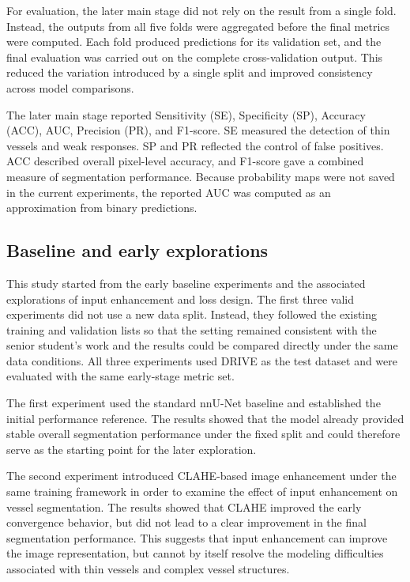 \documentclass[a4paper,12pt]{article}
\begin{document}
For evaluation, the later main stage did not rely on the result from a single fold. Instead, the outputs from all five folds were aggregated before the final metrics were computed. Each fold produced predictions for its validation set, and the final evaluation was carried out on the complete cross-validation output. This reduced the variation introduced by a single split and improved consistency across model comparisons.

The later main stage reported Sensitivity (SE), Specificity (SP), Accuracy (ACC), AUC, Precision (PR), and F1-score. SE measured the detection of thin vessels and weak responses. SP and PR reflected the control of false positives. ACC described overall pixel-level accuracy, and F1-score gave a combined measure of segmentation performance. Because probability maps were not saved in the current experiments, the reported AUC was computed as an approximation from binary predictions.

\subsection{Baseline and early explorations}

This study started from the early baseline experiments and the associated explorations of input enhancement and loss design. The first three valid experiments did not use a new data split. Instead, they followed the existing training and validation lists so that the setting remained consistent with the senior student's work and the results could be compared directly under the same data conditions. All three experiments used DRIVE as the test dataset and were evaluated with the same early-stage metric set.

The first experiment used the standard nnU-Net baseline \cite{isensee2021nnunet} and established the initial performance reference. The results showed that the model already provided stable overall segmentation performance under the fixed split and could therefore serve as the starting point for the later exploration.

The second experiment introduced CLAHE-based image enhancement under the same training framework in order to examine the effect of input enhancement on vessel segmentation. The results showed that CLAHE improved the early convergence behavior, but did not lead to a clear improvement in the final segmentation performance. This suggests that input enhancement can improve the image representation, but cannot by itself resolve the modeling difficulties associated with thin vessels and complex vessel structures.
\end{document}
